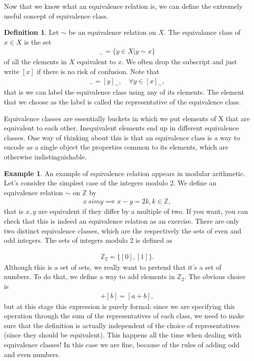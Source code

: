 \documentclass{book}
\theoremstyle{definition}
\newtheorem{defn}{Definition}[section]
\newtheorem{exmp}{Example}[section]
\begin{document}
Now that we know what an equivalence relation is, we can define the extremely useful concept of equivalence class.


\begin{defn}
	Let $\sim$ be an equivalence relation on $X$. The equivalance class of $x \in X$ is the set 
	\begin{align}
	[x]_\sim = \{ y\in X \vert y\sim x   \}
	\end{align}
	of all the elements in $X$ equivalent to $x$. We often drop the subscript and just write $[x]$ if there is no risk of confusion. Note that
	\begin{align}
	[x]_\sim = [y]_\sim, \quad \forall y \in [x]_\sim,
	\end{align}
	that is we can label the equivalence class using any of its elements. The element that we
	choose as the label is called the representative of the equivalence class.
\end{defn}



Equivalence classes are essentially buckets in which we put elements of X that are equivalent
to each other. Inequivalent elements end up in different equivalence classes. One way of
thinking about this is that an equivalence class is a way to encode as a single object the
properties common to its elements, which are otherwise indistinguishable.


\begin{exmp}
	An example of equivalence relation appears in modular arithmetic. Let's consider the simplest case of the integers modulo 2. We define an equivalence relation $\sim$ on $\mathbb{Z}$ by
	\begin{align}
	x\ sim y \implies x-y = 2k, k\in \mathbb{Z},
	\end{align}
	that is $x,y$ are equivalent if they differ by a multiple of two. If you want, you can check that this is indeed an equivalence relation as an exercise. There are only two distinct equivalence classes, which are the respectively the sets of even and odd integers. The sets of integers modulo 2 is
	defined as

	\begin{align}
	\mathbb{Z}_2 = \{ [0], [1]  \}.
	\end{align}
	Although this is a set of sets, we really want to pretend that it's a set of numbers. To do
	that, we define a way to add elements in $\mathbb{Z}_2$. The obvious choice is
	\begin{align}
	[a] + [b] = [a+b],
	\end{align}
	but at this stage this expression is purely formal: since we are specifying this operation
	through the sum of the representatives of each class, we need to make sure that the definition
	is actually independent of the choice of representatives (since they should be equivalent).
	This happens all the time when dealing with equivalence classes! In this case we are fine, because of the rules of adding odd and even numbers. 
\end{exmp}
\end{document}
